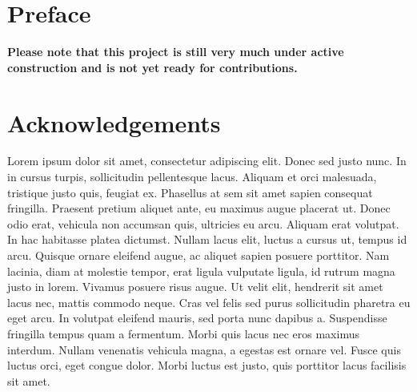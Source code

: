 \documentclass[12pt,openany,oneside]{book}
\let\stdtableofcontents\tableofcontents
\renewcommand{\tableofcontents}{}
\newcommand{\adjustimg}{%
  \checkoddpage%
  \ifoddpage\hspace*{\dimexpr\evensidemargin-\oddsidemargin}\else\hspace*{-\dimexpr\evensidemargin-\oddsidemargin}\fi%
}
\newcommand{\centerimg}[2][width=\textwidth]{%
  \makebox[\textwidth]{\adjustimg\texttt{[image: \#2]}}%
}
\theoremstyle{definition}
\theoremstyle{definition}
\theoremstyle{definition}
\theoremstyle{remark}
\begin{document}
\begin{titlepage}
\mbox{} \par
\noindent\centerimg[width=\paperwidth,height=\paperheight]{assets/misc/book-cover.png}
\end{titlepage}

% 

{
\setcounter{tocdepth}{0}
\tableofcontents
}
\setcounter{page}{1}

\hypertarget{preface}{%
\chapter{Preface}\label{preface}}

\textbf{Please note that this project is still very much under active
construction and is not yet ready for contributions.}

\hypertarget{acknowledgements}{%
\chapter{Acknowledgements}\label{acknowledgements}}

Lorem ipsum dolor sit amet, consectetur adipiscing elit. Donec sed justo
nunc. In in cursus turpis, sollicitudin pellentesque lacus. Aliquam et
orci malesuada, tristique justo quis, feugiat ex. Phasellus at sem sit
amet sapien consequat fringilla. Praesent pretium aliquet ante, eu
maximus augue placerat ut. Donec odio erat, vehicula non accumsan quis,
ultricies eu arcu. Aliquam erat volutpat. In hac habitasse platea
dictumst. Nullam lacus elit, luctus a cursus ut, tempus id arcu. Quisque
ornare eleifend augue, ac aliquet sapien posuere porttitor. Nam lacinia,
diam at molestie tempor, erat ligula vulputate ligula, id rutrum magna
justo in lorem. Vivamus posuere risus augue. Ut velit elit, hendrerit
sit amet lacus nec, mattis commodo neque. Cras vel felis sed purus
sollicitudin pharetra eu eget arcu. In volutpat eleifend mauris, sed
porta nunc dapibus a. Suspendisse fringilla tempus quam a fermentum.
Morbi quis lacus nec eros maximus interdum. Nullam venenatis vehicula
magna, a egestas est ornare vel. Fusce quis luctus orci, eget congue
dolor. Morbi luctus est justo, quis porttitor lacus facilisis sit amet.

\stdtableofcontents
\end{document}
